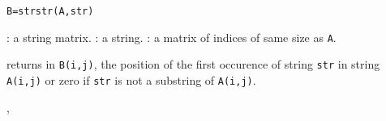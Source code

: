 
\begin{mandesc}
\end{mandesc}
\begin{calling_sequence}
\begin{verbatim}
B=strstr(A,str)
\end{verbatim}
\end{calling_sequence}

\begin{parameters}
  \begin{varlist}
    : a string matrix.
    : a string.
    : a matrix of indices of same size as \verb+A+.
  \end{varlist}
\end{parameters}

\begin{mandescription}
  returns in \verb+B(i,j)+, the position of the first occurence 
  of string \verb+str+ in string \verb+A(i,j)+ or zero if \verb+str+ 
  is not a substring of \verb+A(i,j)+.
\end{mandescription}

\begin{manseealso}
  ,   
\end{manseealso}

\begin{manseealso}
\end{manseealso}
